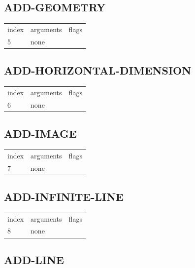 \documentclass[11pt]{report}
\begin{document}
\subsection{ADD-GEOMETRY}

\begin{center}
\begin{tabular}{l | l | l}
index & arguments & flags \\
5 & none & 
\end{tabular}
\end{center}

\subsection{ADD-HORIZONTAL-DIMENSION}

\begin{center}
\begin{tabular}{l | l | l}
index & arguments & flags \\
6 & none & 
\end{tabular}
\end{center}

\subsection{ADD-IMAGE}

\begin{center}
\begin{tabular}{l | l | l}
index & arguments & flags \\
7 & none & 
\end{tabular}
\end{center}

\subsection{ADD-INFINITE-LINE}

\begin{center}
\begin{tabular}{l | l | l}
index & arguments & flags \\
8 & none & 
\end{tabular}
\end{center}

\subsection{ADD-LINE}
\end{document}
